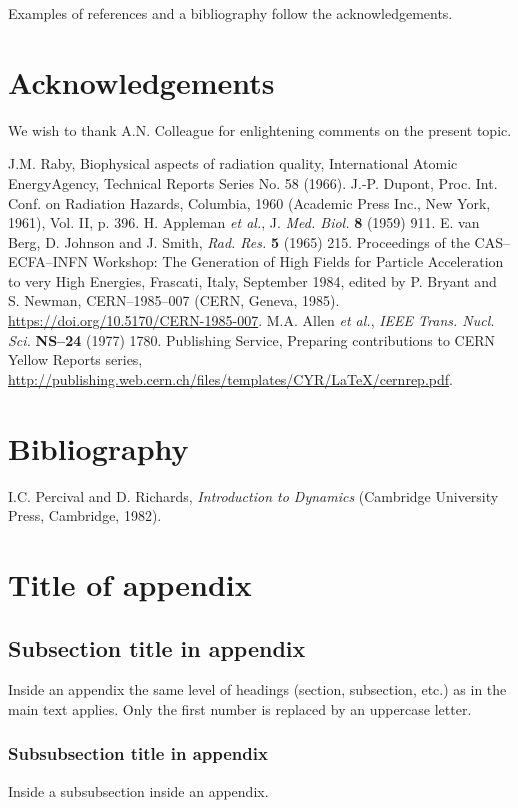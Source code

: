 \documentclass{cernrep}
\begin{document}
Examples of references and a bibliography follow the acknowledgements.

\section*{Acknowledgements}

We wish to thank A.N. Colleague for enlightening comments on
the present topic.

\begin{thebibliography}{99}
J.M. Raby, Biophysical aspects of radiation quality, International 
Atomic EnergyAgency, Technical Reports Series No. 58 (1966).
J.-P. Dupont, Proc. Int. Conf. on Radiation Hazards, Columbia, 
1960 (Academic Press Inc., New York, 1961), Vol. II, p. 396.
H. Appleman \emph{et al.}, J. \emph{Med. Biol.} \textbf{8} (1959) 911.
E. van Berg, D. Johnson and J. Smith, \emph{Rad. Res.} \textbf{5} (1965) 
215.
Proceedings of the CAS--ECFA--INFN Workshop: The Generation of High Fields for Particle Acceleration to very High Energies, Frascati, Italy, September 1984, edited by P. Bryant and S. Newman, CERN--1985--007 (CERN, Geneva, 1985).\\
\url{https://doi.org/10.5170/CERN-1985-007}.
M.A. Allen \emph{et al.}, \emph{IEEE Trans. Nucl. Sci.} \textbf{NS--24} (1977) 
1780.
Publishing Service, Preparing contributions to CERN Yellow Reports series,\\
\url{http://publishing.web.cern.ch/files/templates/CYR/LaTeX/cernrep.pdf}.
\end{thebibliography}

\section*{Bibliography}


I.C. Percival and D. Richards, \emph{Introduction to Dynamics}
(Cambridge University Press, Cambridge, 1982).

\appendix
\section{Title of appendix}
\label{sec:app}

\subsection{Subsection title in appendix}

Inside an appendix the same level of headings (section, subsection,
etc.) as in the main text applies. Only the first number is replaced
by an uppercase letter.

\subsubsection{Subsubsection title in appendix}

Inside a subsubsection inside an appendix.

\end{document}
